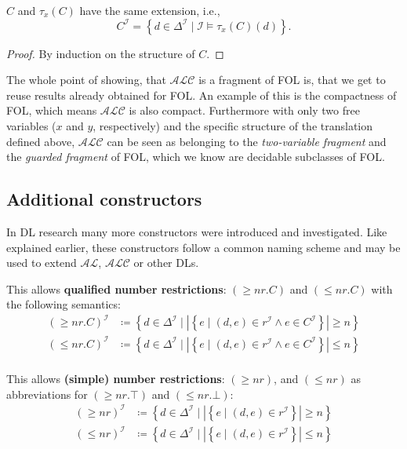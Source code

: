 \begin{lemma}
	$C$ and $\tau_{x}(C)$ have the same extension, i.e.,
	\[
		C^{\mathcal{I}} = \left\{ d \in \Delta^{\mathcal{I}} \mid \mathcal{I} \vDash \tau_{x}(C)(d) \right\} 
	.\] 
\end{lemma}
\begin{proof}
	By induction on the structure of $C$.
\end{proof}
The whole point of showing, that $\mathcal{ALC}$ is a fragment of FOL is, that we get to reuse results already obtained for FOL.
An example of this is the compactness of FOL, which means $\mathcal{ALC}$ is also compact.
Furthermore with only two free variables ($x$ and $y$, respectively) and the specific structure of the translation defined above,
$\mathcal{ALC}$ can be seen as belonging to the \textit{two-variable fragment} and the \textit{guarded fragment} of FOL,
which we know are decidable subclasses of FOL.

\subsection{Additional constructors}
In DL research many more constructors were introduced and investigated.
Like explained earlier, these constructors follow a common naming scheme and may be used to extend $\mathcal{AL}$, $\mathcal{ALC}$ or other DLs.
\begin{example}
	This allows \textbf{qualified number restrictions}: 
	$\left( \geq nr.C \right) $ and $\left( \leq nr.C \right) $ with the following semantics:
	\begin{align*}
		\left( \geq nr.C \right) ^{\mathcal{I}} &\coloneqq \left\{ d \in \Delta^{\mathcal{I}} \mid \left| \left\{ e \mid (d,e) \in r^{\mathcal{I}} \land e \in C^{\mathcal{I}} \right\} \right| \geq n \right\} \\
		\left( \leq nr.C \right) ^{\mathcal{I}} &\coloneqq \left\{ d \in \Delta^{\mathcal{I}} \mid \left| \left\{ e \mid (d,e) \in r^{\mathcal{I}} \land e \in C^{\mathcal{I}} \right\} \right| \leq n \right\} \\
	\end{align*}
\end{example}

\begin{example}
	This allows \textbf{(simple) number restrictions}:
	$\left( \geq nr \right)$, and $\left( \leq nr \right)$ as abbreviations for $\left( \geq nr.\top \right)$ and $\left( \leq nr.\bot \right)$:
	\begin{align*}
		\left( \geq nr \right) ^{\mathcal{I}} &\coloneqq \left\{ d \in \Delta^{\mathcal{I}} \mid \left| \left\{ e \mid (d,e) \in r^{\mathcal{I}} \right\}  \right| \geq n \right\} \\
		\left( \leq nr \right) ^{\mathcal{I}} &\coloneqq \left\{ d \in \Delta^{\mathcal{I}} \mid \left| \left\{ e \mid (d,e) \in r^{\mathcal{I}} \right\}  \right| \leq n \right\} 
	\end{align*}
\end{example}

